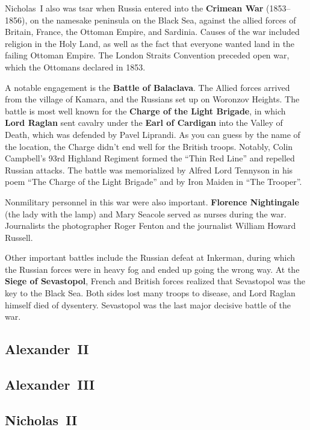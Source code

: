 Nicholas~I also was tsar when Russia entered into the \textbf{Crimean War} (1853--1856),
on the namesake peninsula on the Black Sea,
against the allied forces of Britain, France, the Ottoman Empire, and Sardinia.
Causes of the war included religion in the Holy Land,
as well as the fact that everyone wanted land in the failing Ottoman Empire.
The London Straits Convention preceded open war, which the Ottomans declared in 1853.

A notable engagement is the \textbf{Battle of Balaclava}.
The Allied forces arrived from the village of Kamara, and the Russians set up on Woronzov Heights.
The battle is most well known for the \textbf{Charge of the Light Brigade},
in which \textbf{Lord Raglan} sent cavalry under the \textbf{Earl of Cardigan} into the Valley of Death,
which was defended by Pavel Liprandi.
As you can guess by the name of the location, the Charge didn't end well for the British troops.
Notably, Colin Campbell's 93rd Highland Regiment formed the ``Thin Red Line'' and repelled Russian attacks.
The battle was memorialized by Alfred Lord Tennyson in his poem ``The Charge of the Light Brigade''
and by Iron Maiden in ``The Trooper''.

Nonmilitary personnel in this war were also important.
\textbf{Florence Nightingale} (the lady with the lamp) and Mary Seacole served as nurses during the war.
Journalists the photographer Roger Fenton and the journalist William Howard Russell.

Other important battles include the Russian defeat at Inkerman,
during which the Russian forces were in heavy fog and ended up going the wrong way.
At the \textbf{Siege of Sevastopol}, French and British forces realized that Sevastopol was the key to the Black Sea.
Both sides lost many troops to disease, and Lord Raglan himself died of dysentery.
Sevastopol was the last major decisive battle of the war.


\subsection*{Alexander~II}

\subsection*{Alexander~III}

\subsection*{Nicholas~II}

